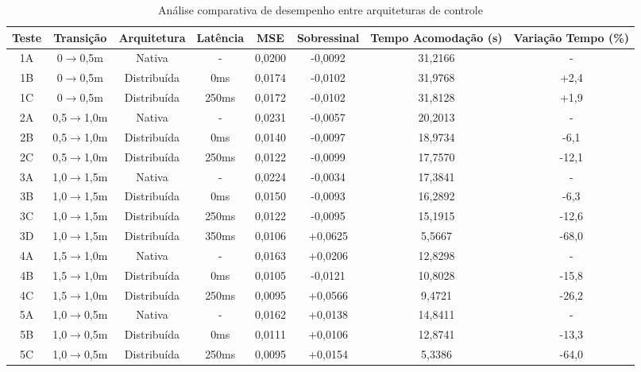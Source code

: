 \begin{table}[H]
\centering
\caption{Análise comparativa de desempenho entre arquiteturas de controle}
\begin{adjustbox}{max width=\textwidth}
\begin{tabular}{|c|c|c|c|c|c|c|c|}
\hline
\textbf{Teste} & \textbf{Transição} & \textbf{Arquitetura} & \textbf{Latência} & \textbf{MSE} & \textbf{Sobressinal} & \textbf{Tempo Acomodação (s)} & \textbf{Variação Tempo (\%)} \\
\hline
1A & 0$\rightarrow$0,5m & Nativa      & -      & 0,0200 & -0,0092 & 31,2166 & - \\
1B & 0$\rightarrow$0,5m & Distribuída & 0ms    & 0,0174 & -0,0102 & 31,9768 & +2,4 \\
1C & 0$\rightarrow$0,5m & Distribuída & 250ms  & 0,0172 & -0,0102 & 31,8128 & +1,9 \\
2A & 0,5$\rightarrow$1,0m & Nativa      & -      & 0,0231 & -0,0057 & 20,2013 & - \\
2B & 0,5$\rightarrow$1,0m & Distribuída & 0ms    & 0,0140 & -0,0097 & 18,9734 & -6,1 \\
2C & 0,5$\rightarrow$1,0m & Distribuída & 250ms  & 0,0122 & -0,0099 & 17,7570 & -12,1 \\
3A & 1,0$\rightarrow$1,5m & Nativa      & -      & 0,0224 & -0,0034 & 17,3841 & - \\
3B & 1,0$\rightarrow$1,5m & Distribuída & 0ms    & 0,0150 & -0,0093 & 16,2892 & -6,3 \\
3C & 1,0$\rightarrow$1,5m & Distribuída & 250ms  & 0,0122 & -0,0095 & 15,1915 & -12,6 \\
3D & 1,0$\rightarrow$1,5m & Distribuída & 350ms  & 0,0106 & +0,0625 & 5,5667  & -68,0 \\
4A & 1,5$\rightarrow$1,0m & Nativa      & -      & 0,0163 & +0,0206 & 12,8298 & - \\
4B & 1,5$\rightarrow$1,0m & Distribuída & 0ms    & 0,0105 & -0,0121 & 10,8028 & -15,8 \\
4C & 1,5$\rightarrow$1,0m & Distribuída & 250ms  & 0,0095 & +0,0566 & 9,4721  & -26,2 \\
5A & 1,0$\rightarrow$0,5m & Nativa      & -      & 0,0162 & +0,0138 & 14,8411 & - \\
5B & 1,0$\rightarrow$0,5m & Distribuída & 0ms    & 0,0111 & +0,0106 & 12,8741 & -13,3 \\
5C & 1,0$\rightarrow$0,5m & Distribuída & 250ms  & 0,0095 & +0,0154 & 5,3386  & -64,0 \\
\hline
\end{tabular}
\end{adjustbox}
\label{tab:comparativo-arquiteturas}
\end{table}

